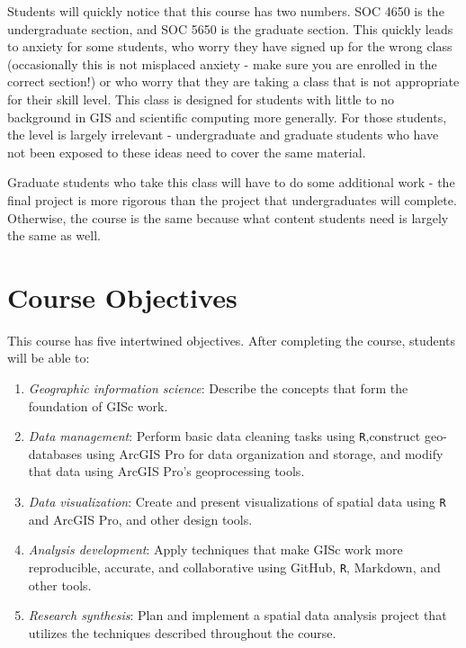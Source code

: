 \documentclass[]{book}
\begin{document}
Students will quickly notice that this course has two numbers. SOC 4650 is the undergraduate section, and SOC 5650 is the graduate section. This quickly leads to anxiety for some students, who worry they have signed up for the wrong class (occasionally this is not misplaced anxiety - make sure you are enrolled in the correct section!) or who worry that they are taking a class that is not appropriate for their skill level. This class is designed for students with little to no background in GIS and scientific computing more generally. For those students, the level is largely irrelevant - undergraduate and graduate students who have not been exposed to these ideas need to cover the same material.

Graduate students who take this class will have to do some additional work - the final project is more rigorous than the project that undergraduates will complete. Otherwise, the course is the same because what content students need is largely the same as well.

\hypertarget{course-objectives}{%
\section{Course Objectives}\label{course-objectives}}

This course has five intertwined objectives. After completing the course, students will be able to:

\begin{enumerate}
\def\labelenumi{\arabic{enumi}.}
\item
  \emph{Geographic information science}: Describe the concepts that form the foundation of GISc work.
\item
  \emph{Data management}: Perform basic data cleaning tasks using \texttt{R},construct geo-databases using ArcGIS Pro for data organization and storage, and modify that data using ArcGIS Pro's geoprocessing tools.
\item
  \emph{Data visualization}: Create and present visualizations of spatial data using \texttt{R} and ArcGIS Pro, and other design tools.
\item
  \emph{Analysis development}: Apply techniques that make GISc work more reproducible, accurate, and collaborative using GitHub, \texttt{R}, Markdown, and other tools.
\item
  \emph{Research synthesis}: Plan and implement a spatial data analysis project that utilizes the techniques described throughout the course.
\end{enumerate}
\end{document}
